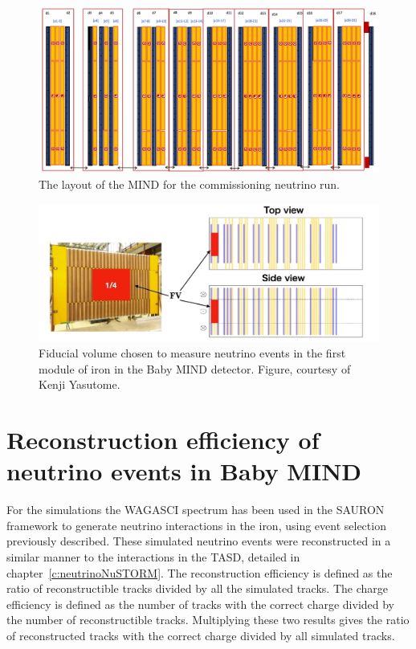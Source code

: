 \begin{figure}
\centering
\includegraphics[width=\textwidth]{figures/NeutrinoChap/NuFactTalk/Layout300118.jpeg}
\caption{The layout of the MIND for the commissioning neutrino run.}
\label{fig:MINDneutrinoLayout}
\end{figure}

\begin{figure}
\centering
\includegraphics[width=\textwidth]{figures/NeutrinoChap/NuFactTalk/eventRateCheck.jpeg}
\caption{Fiducial volume chosen to measure neutrino events in the first module of iron in the Baby MIND detector. Figure, courtesy of Kenji Yasutome.}
\label{fig:MINDFiducial}
\end{figure}

\section{Reconstruction efficiency of neutrino events in Baby MIND}


For the simulations the WAGASCI spectrum has been used in the SAURON framework to generate neutrino interactions in the iron, using event selection previously described. These simulated neutrino events were reconstructed in a similar manner to the interactions in the TASD, detailed in chapter~\ref{c:neutrinoNuSTORM}. The reconstruction efficiency is defined as the ratio of reconstructible tracks divided by all the simulated tracks. The charge efficiency is defined as the number of tracks with the correct charge divided by the number of reconstructible tracks. Multiplying these two results gives the ratio of reconstructed tracks with the correct charge divided by all simulated tracks.


